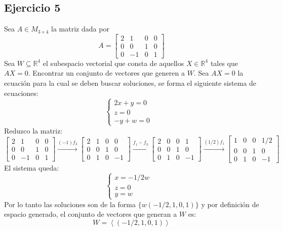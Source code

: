 \documentclass[a4paper,12pt]{article}
\begin{document}
\subsection{Ejercicio 5}
Sea $A\in M_{3\times 4}$ la matriz dada por
$$
A = \begin{bmatrix}
2 & 1 & 0 & 0\\ 
0 & 0 & 1 & 0 \\ 
0 & -1 & 0 & 1
\end{bmatrix}
$$
Sea $W\subseteq \mathds{R}^4 $ el subespacio vectorial que consta de aquellos $X\in\mathds{R}^4$ tales que $AX=0$. Encontrar un conjunto de vectores que generen a $W$. \newline
Sea $AX=0$ la ecuación para la cual se deben buscar soluciones, se forma el siguiente sistema de ecuaciones:
$$
\begin{cases}
    2x+y = 0 & \\
    z = 0 & \\
    -y + w = 0 
\end{cases}
$$
Reduzco la matriz:
$$
\begin{bmatrix}
2 & 1 & 0 & 0\\ 
0 & 0 & 1 & 0 \\ 
0 & -1 & 0 & 1
\end{bmatrix}
\xrightarrow[]{(-1)f_3}
\begin{bmatrix}
2 & 1 & 0 & 0\\ 
0 & 0 & 1 & 0 \\ 
0 & 1 & 0 & -1
\end{bmatrix}
\xrightarrow[]{f_1-f_3}
\begin{bmatrix}
2 & 0 & 0 & 1\\ 
0 & 0 & 1 & 0 \\ 
0 & 1 & 0 & -1
\end{bmatrix}
\xrightarrow[]{(1/2)f_1}
\begin{bmatrix}
1 & 0 & 0 & 1/2\\ 
0 & 0 & 1 & 0 \\ 
0 & 1 & 0 & -1
\end{bmatrix}
$$
El sistema queda:
$$
\begin{cases}
    x = -1/2w & \\
    z = 0 & \\
    y = w 
\end{cases}
$$
Por lo tanto las soluciones son de la forma $\{ w(-1/2,1,0,1) \}$ y por definición de espacio generado, el conjunto de vectores que generan a $W$ es:
$$
W = \left \langle (-1/2,1,0,1) \right \rangle
$$
\end{document}
